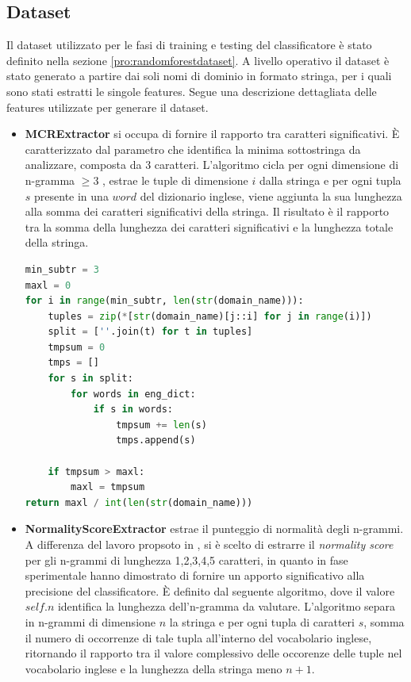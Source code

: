 \subsection{Dataset}
Il dataset utilizzato per le fasi di training e testing del classificatore è stato definito nella sezione \ref{pro:randomforestdataset}. A livello operativo il dataset è stato generato a partire dai soli nomi di dominio in formato stringa, per i quali sono stati estratti le singole features. Segue una descrizione dettagliata delle features utilizzate per generare il dataset.

\begin{itemize}
\item \textbf{MCRExtractor} si occupa di fornire il rapporto tra caratteri significativi. \`E caratterizzato dal parametro che identifica la minima sottostringa da analizzare, composta da 3 caratteri. L'algoritmo cicla per ogni dimensione di n-gramma $\geq 3$ , estrae le tuple di dimensione $i$ dalla stringa e per ogni tupla $s$ presente in una $word$ del dizionario inglese, viene aggiunta la sua lunghezza alla somma dei caratteri significativi della stringa. 
Il risultato è il rapporto tra la somma della lunghezza dei caratteri significativi e la lunghezza totale della stringa.
 
\begin{lstlisting}[language=Python]
min_subtr = 3
maxl = 0
for i in range(min_subtr, len(str(domain_name))):
	tuples = zip(*[str(domain_name)[j::i] for j in range(i)])
	split = [''.join(t) for t in tuples]
	tmpsum = 0
	tmps = []
	for s in split:
		for words in eng_dict:
			if s in words:
				tmpsum += len(s)
				tmps.append(s)

	if tmpsum > maxl:
		maxl = tmpsum
return maxl / int(len(str(domain_name)))
\end{lstlisting}

\item \textbf{NormalityScoreExtractor} estrae il punteggio di normalità degli n-grammi. A differenza del lavoro propsoto in \cite{Schiavoni2014}, si è scelto di estrarre il \textit{normality score} per gli n-grammi di lunghezza 1,2,3,4,5 caratteri, in quanto in fase sperimentale hanno dimostrato di fornire un apporto significativo alla precisione del classificatore. \`E definito dal seguente algoritmo, dove il valore $self.n$ identifica la lunghezza dell'n-gramma da valutare. L'algoritmo separa in n-grammi di dimensione $n$ la stringa e per ogni tupla di caratteri $s$, somma il numero di occorrenze di tale tupla all'interno del vocabolario inglese, ritornando il rapporto tra il valore complessivo delle occorenze delle tuple nel vocabolario inglese e la lunghezza della stringa meno $n+1$.


\end{itemize}
